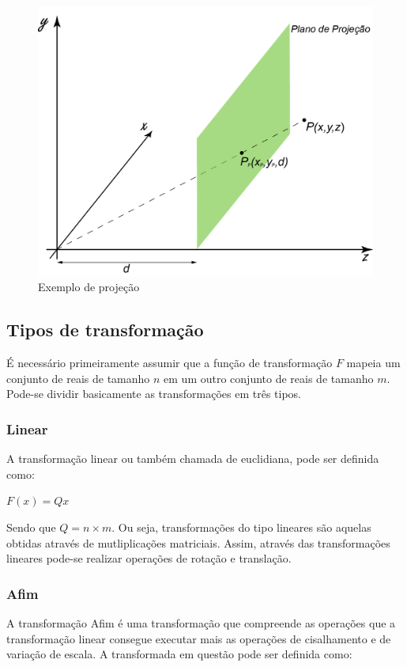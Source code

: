 \documentclass[9pt, a4paper, nofonttune, journal]{IEEEtran}
\begin{document}
\begin{figure}[H] 
\begin{center}
\includegraphics[scale=0.25]{figuras/projection1.png}
\caption{Exemplo de projeção}
\end{center}
\end{figure}


\subsection{Tipos de transformação}
É necessário primeiramente assumir que a função de transformação $F$ mapeia um conjunto de reais de tamanho $n$ em um outro conjunto de reais de tamanho $m$.
Pode-se dividir basicamente as transformações em três tipos.
\subsubsection{Linear}
A transformação linear ou também chamada de euclidiana, pode ser definida como:
\begin{center}
$F(x)=Qx$\end{center}
Sendo que $Q=n\times m$.
Ou seja, transformações do tipo lineares são aquelas obtidas através de mutliplicações matriciais.
Assim, através das transformações lineares pode-se realizar operações de rotação e translação.\cite{CGPPBook1}
\subsubsection{Afim}
A transformação Afim é uma transformação que compreende as operações que a transformação linear
consegue executar mais as operações de cisalhamento e de variação de escala. A transformada em questão pode ser definida como:
\end{document}
